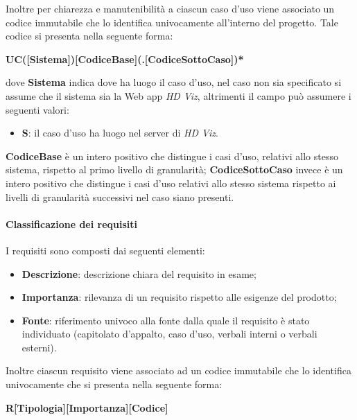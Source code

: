 Inoltre per chiarezza e manutenibilità a ciascun caso d'uso viene associato un codice immutabile che lo identifica univocamente
all'interno del progetto. Tale codice si presenta nella seguente forma:
\begin{center}
    \textbf{UC([Sistema])[CodiceBase](.[CodiceSottoCaso])*}
\end{center}
dove \textbf{Sistema} indica dove ha luogo il caso d'uso, nel caso non sia specificato si assume che il sistema sia la Web app
\emph{HD Viz}, altrimenti il campo può assumere i seguenti valori:
\begin{itemize}
	\item \textbf{S}: il caso d'uso ha luogo nel server di \emph{HD Viz}.
\end{itemize}
\textbf{CodiceBase} è un intero positivo che distingue i casi d'uso, relativi allo stesso sistema, rispetto al primo livello di
granularità; \textbf{CodiceSottoCaso} invece è un intero positivo che distingue i casi d'uso relativi allo stesso sistema rispetto ai
livelli di granularità successivi nel caso siano presenti.

\paragraph{Classificazione dei requisiti}
\label{par:classificazione_requisiti}

I requisiti sono composti dai seguenti elementi:
\begin{itemize}
	\item \textbf{Descrizione}: descrizione chiara del requisito in esame;
	\item \textbf{Importanza}: rilevanza di un requisito rispetto alle esigenze del prodotto;
	\item \textbf{Fonte}: riferimento univoco alla fonte dalla quale il requisito è stato individuato (capitolato d'appalto, caso d'uso,
		verbali interni o verbali esterni).
\end{itemize}

Inoltre ciascun requisito viene associato ad un codice immutabile che lo identifica univocamente che si presenta nella seguente forma:
\begin{center}
    \textbf{R[Tipologia][Importanza][Codice]}
\end{center}

